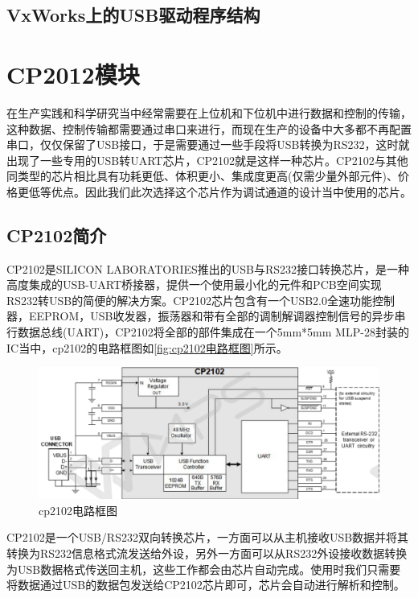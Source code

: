 \subsection{VxWorks上的USB驱动程序结构}


\section{CP2012模块}
在生产实践和科学研究当中经常需要在上位机和下位机中进行数据和控制的传输，这种数据、控制传输都需要通过串口来进行，而现在生产的设备中大多都不再配置串口，仅仅保留了USB接口，于是需要通过一些手段将USB转换为RS232，这时就出现了一些专用的USB转UART芯片，CP2102就是这样一种芯片。CP2102与其他同类型的芯片相比具有功耗更低、体积更小、集成度更高(仅需少量外部元件)、价格更低等优点。因此我们此次选择这个芯片作为调试通道的设计当中使用的芯片。
\subsection{CP2102简介}
	CP2102是SILICON LABORATORIES推出的USB与RS232接口转换芯片，是一种高度集成的USB-UART桥接器，提供一个使用最小化的元件和PCB空间实现RS232转USB的简便的解决方案。CP2102芯片包含有一个USB2.0全速功能控制器，EEPROM，USB收发器，振荡器和带有全部的调制解调器控制信号的异步串行数据总线(UART)，CP2102将全部的部件集成在一个5mm*5mm MLP-28封装的IC当中\cite{CP2102}，cp2102的电路框图如\autoref{fig:cp2102电路框图}所示。

\begin{figure}[!h]
\centering
\includegraphics[width=1.0\textwidth]{./graphics/cp2102-circuit-diagram.pdf}
\caption{cp2102电路框图}\label{fig:cp2102电路框图}
\end{figure}

	CP2102是一个USB/RS232双向转换芯片，一方面可以从主机接收USB数据并将其转换为RS232信息格式流发送给外设，另外一方面可以从RS232外设接收数据转换为USB数据格式传送回主机，这些工作都会由芯片自动完成。使用时我们只需要将数据通过USB的数据包发送给CP2102芯片即可，芯片会自动进行解析和控制。
	
